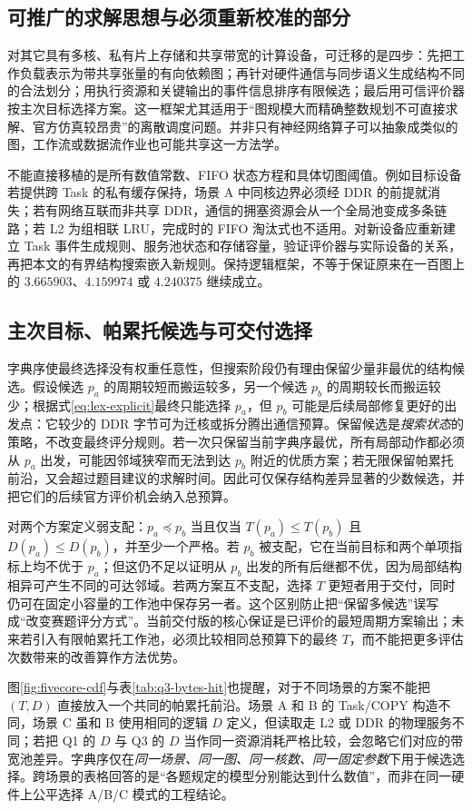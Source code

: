 \subsection{可推广的求解思想与必须重新校准的部分}
对其它具有多核、私有片上存储和共享带宽的计算设备，可迁移的是四步：先把工作负载表示为带共享张量的有向依赖图；再针对硬件通信与同步语义生成结构不同的合法划分；用执行资源和关键输出的事件信息排序有限候选；最后用可信评价器按主次目标选择方案。这一框架尤其适用于“图规模大而精确整数规划不可直接求解、官方仿真较昂贵”的离散调度问题。并非只有神经网络算子可以抽象成类似的图，工作流或数据流作业也可能共享这一方法学。

不能直接移植的是所有数值常数、FIFO 状态方程和具体切图阈值。例如目标设备若提供跨 Task 的私有缓存保持，场景 A 中同核边界必须经 DDR 的前提就消失；若有网络互联而非共享 DDR，通信的拥塞资源会从一个全局池变成多条链路；若 L2 为组相联 LRU，完成时的 FIFO 淘汰式也不适用。对新设备应重新建立 Task 事件生成规则、服务池状态和存储容量，验证评价器与实际设备的关系，再把本文的有界结构搜索嵌入新规则。保持逻辑框架，不等于保证原来在一百图上的 $3.665903$、$4.159974$ 或 $4.240375$ 继续成立。

\subsection{主次目标、帕累托候选与可交付选择}
字典序使最终选择没有权重任意性，但搜索阶段仍有理由保留少量非最优的结构候选。假设候选 $p_a$ 的周期较短而搬运较多，另一个候选 $p_b$ 的周期较长而搬运较少；根据式\eqref{eq:lex-explicit}最终只能选择 $p_a$，但 $p_b$ 可能是后续局部修复更好的出发点：它较少的 DDR 字节可为迁核或拆分腾出通信预算。保留候选是\emph{搜索状态}的策略，不改变最终评分规则。若一次只保留当前字典序最优，所有局部动作都必须从 $p_a$ 出发，可能因邻域狭窄而无法到达 $p_b$ 附近的优质方案；若无限保留帕累托前沿，又会超过题目建议的求解时间。因此可仅保存结构差异显著的少数候选，并把它们的后续官方评价机会纳入总预算。

对两个方案定义弱支配：$p_a\preceq p_b$ 当且仅当 $T(p_a)\le T(p_b)$ 且 $D(p_a)\le D(p_b)$，并至少一个严格。若 $p_b$ 被支配，它在当前目标和两个单项指标上均不优于 $p_a$；但这仍不足以证明从 $p_b$ 出发的所有后继都不优，因为局部结构相异可产生不同的可达邻域。若两方案互不支配，选择 $T$ 更短者用于交付，同时仍可在固定小容量的工作池中保存另一者。这个区别防止把“保留多候选”误写成“改变赛题评分方式”。当前交付版的核心保证是已评价的最短周期方案输出；未来若引入有限帕累托工作池，必须比较相同总预算下的最终 $T$，而不能把更多评估次数带来的改善算作方法优势。

图\ref{fig:fivecore-cdf}与表\ref{tab:q3-bytes-hit}也提醒，对于不同场景的方案不能把 $(T,D)$ 直接放入一个共同的帕累托前沿。场景 A 和 B 的 Task/COPY 构造不同，场景 C 虽和 B 使用相同的逻辑 $D$ 定义，但读取走 L2 或 DDR 的物理服务不同；若把 Q1 的 $D$ 与 Q3 的 $D$ 当作同一资源消耗严格比较，会忽略它们对应的带宽池差异。字典序仅在\emph{同一场景、同一图、同一核数、同一固定参数}下用于候选选择。跨场景的表格回答的是“各题规定的模型分别能达到什么数值”，而非在同一硬件上公平选择 A/B/C 模式的工程结论。

